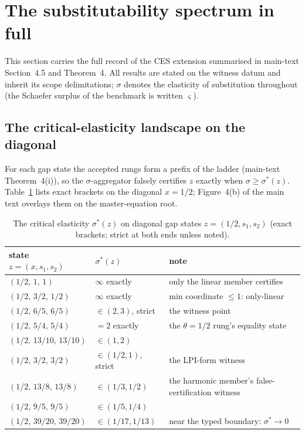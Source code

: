 \section{The substitutability spectrum in full}\label{si:spectrum}

This section carries the full record of the CES extension summarised in main-text Section~4.5 and Theorem~4. All results are stated on the witness datum and inherit its scope delimitations; $\sigma$ denotes the elasticity of substitution throughout (the Schaefer surplus of the benchmark is written $\varsigma$).

\subsection{The critical-elasticity landscape on the diagonal}

For each gap state the accepted rungs form a prefix of the ladder (main-text Theorem~4(i)), so the $\sigma$-aggregator falsely certifies $z$ exactly when $\sigma\ge\sigma^*(z)$. Table~\ref{tab:sigmastar} lists exact brackets on the diagonal $x=1/2$; Figure~4(b) of the main text overlays them on the master-equation root.

\begin{table}[!htbp]
\centering\small
\caption{The critical elasticity $\sigma^*(z)$ on diagonal gap states $z=(1/2,s_1,s_2)$ (exact brackets; strict at both ends unless noted).}
\label{tab:sigmastar}
\begin{tabular}{@{}llp{6.4cm}@{}}
\toprule
state $z=(x,s_1,s_2)$ & $\sigma^*(z)$ & note \\
\midrule
$(1/2,\,1,\,1)$ & $\infty$ exactly & only the linear member certifies \\
$(1/2,\,3/2,\,1/2)$ & $\infty$ exactly & min coordinate $\le1$: only-linear \\
$(1/2,\,6/5,\,6/5)$ & $\in(2,3)$, strict & the witness point \\
$(1/2,\,5/4,\,5/4)$ & $=2$ exactly & the $\theta=1/2$ rung's equality state \\
$(1/2,\,13/10,\,13/10)$ & $\in(1,2)$ & \\
$(1/2,\,3/2,\,3/2)$ & $\in(1/2,1)$, strict & the LPI-form witness \\
$(1/2,\,13/8,\,13/8)$ & $\in(1/3,1/2)$ & the harmonic member's false-certification witness \\
$(1/2,\,9/5,\,9/5)$ & $\in(1/5,1/4)$ & \\
$(1/2,\,39/20,\,39/20)$ & $\in(1/17,1/13)$ & near the typed boundary: $\sigma^*\to0$ \\
\bottomrule
\end{tabular}
\end{table}


